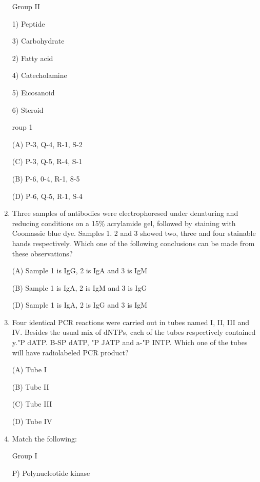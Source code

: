 \documentclass[journal]{IEEEtran}
\begin{document}
\begin{enumerate}
\begin{minipage}{0.5\textwidth}
\begin{flushleft}
		\end{flushleft}
		\end{minipage}
	\begin{minipage}{0.5\textwidth}
		\begin{flushright}
Group II

1) Peptide

3) Carbohydrate

2) Fatty acid

4) Catecholamine

5) Eicosanoid

6) Steroid
		\end{flushright}
		\end{minipage}roup 1


(A) P-3, Q-4, R-1, S-2

(C) P-3, Q-5, R-4, S-1


(B) P-6, 0-4, R-1, 8-5

(D) P-6, Q-5, R-1, S-4

\item {Three samples of antibodies were electrophoresed under denaturing and reducing conditions on a 15\% acrylamide gel, followed by staining with Coomassie blue dye. Samples 1. 2 and 3 showed two, three and four stainable hands respectively. Which one of the following conclusions can be made from these observations?

(A) Sample 1 is IgG, 2 is IgA and 3 is IgM

(B) Sample 1 is IgA, 2 is IgM and 3 is IgG

(D) Sample 1 is IgA, 2 is IgG and 3 is IgM}

\item {Four identical PCR reactions were carried out in tubes named I, II, III and IV. Besides the usual mix of dNTPs, cach of the tubes respectively contained y."P dATP. B-SP dATP, "P JATP and a-"P INTP. Which one of the tubes will have radiolabeled PCR product?

(A) Tube I

(B) Tube II

(C) Tube III

(D) Tube IV}

\item {Match the following:}


\begin{minipage}{0.5\textwidth}
\begin{flushleft}

Group I

P) Polynucleotide kinase


\end{flushleft}
\end{minipage}
\end{enumerate}
\end{document}
